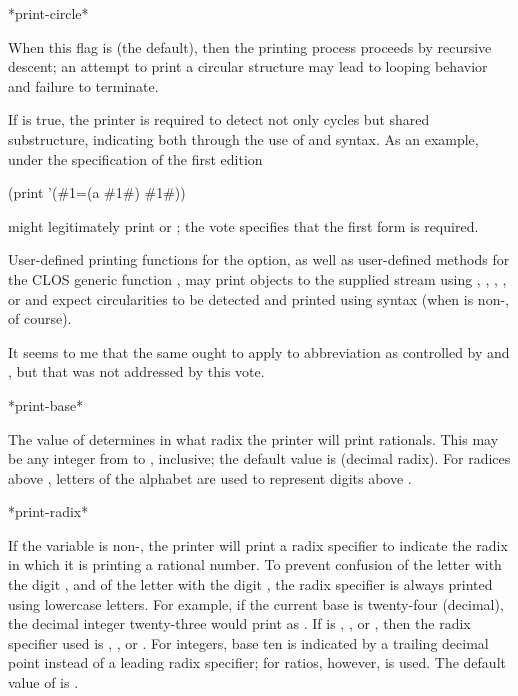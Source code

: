 \begin{defun}[Variable]
*print-circle*

When this flag is {\false} (the default), then the printing process proceeds
by recursive descent; an attempt to print a circular structure may lead
to looping behavior and failure to terminate.

If  is true, the printer is required
to detect not only cycles but shared substructure, indicating both through the
use of  and  syntax.
As an example, under the specification of the first edition
\begin{lisp}
(print '(\#1=(a \#1\#) \#1\#))
\end{lisp}
might legitimately print  or
; the vote specifies that the first
form is required.

User-defined printing functions for the 
 option, as well as user-defined methods for the
CLOS generic function , may print objects to the
supplied stream using , , , ,
or  and expect circularities to be detected and printed
using  syntax (when  is non-, of course).

It seems to me that the same ought to apply to abbreviation
as controlled by  and , but that
was not addressed by this vote.
\end{defun}

\begin{defun}[Variable]
*print-base*

The value of  determines in what radix the printer will print
rationals.  This may be any integer from  to , inclusive;
the default value is  (decimal radix).
For radices above , letters of the alphabet are used to represent
digits above .
\end{defun}

\begin{defun}[Variable]
*print-radix*

If the variable  is non-{\false}, the printer will print a
radix specifier to indicate the radix in which it is printing a rational
number.  To prevent confusion of the letter  with the digit ,
and of the letter  with the digit , the radix specifier
is always printed using lowercase letters.
For example, if the current base is twenty-four (decimal), the
decimal integer twenty-three would print as .  If 
is , , or , then the radix specifier used is ,
, or .  For integers, base ten is indicated by a trailing
decimal point instead of a leading radix specifier; for ratios, however,
 is used.  The default value of  is {\false}.
\end{defun}

